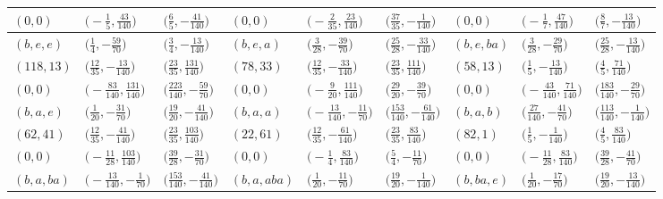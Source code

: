 \documentclass[10pt,a4paper]{amsart}
\theoremstyle{definition}
\numberwithin{equation}{section}
\begin{document}
\begin{landscape}
\begin{table}[th]
\begin{tabular}{|lll|lll|lll|}
\\
$(0, 0)$ & $\bigl(-\frac{1}{5}, \frac{43}{140}\bigr)$ & $\bigl(\frac{6}{5}, -\frac{41}{140}\bigr)$ & $(0, 0)$ & $\bigl(-\frac{2}{35}, \frac{23}{140}\bigr)$ & $\bigl(\frac{37}{35}, -\frac{1}{140}\bigr)$ & $(0, 0)$ & $\bigl(-\frac{1}{7}, \frac{47}{140}\bigr)$ & $\bigl(\frac{8}{7}, -\frac{13}{140}\bigr)$
\\\hline
$(b, e, e)$ & $\bigl(\frac{1}{4}, -\frac{59}{70}\bigr)$ & $\bigl(\frac{3}{4}, -\frac{13}{140}\bigr)$ & $(b, e, a)$ & $\bigl(\frac{3}{28}, -\frac{39}{70}\bigr)$ & $\bigl(\frac{25}{28}, -\frac{33}{140}\bigr)$ & $(b, e, ba)$ & $\bigl(\frac{3}{28}, -\frac{29}{70}\bigr)$ & $\bigl(\frac{25}{28}, -\frac{13}{140}\bigr)$
\\
$(118, 13)$ & $\bigl(\frac{12}{35}, -\frac{13}{140}\bigr)$ & $\bigl(\frac{23}{35}, \frac{131}{140}\bigr)$ & $(78, 33)$ & $\bigl(\frac{12}{35}, -\frac{33}{140}\bigr)$ & $\bigl(\frac{23}{35}, \frac{111}{140}\bigr)$ & $(58, 13)$ & $\bigl(\frac{1}{5}, -\frac{13}{140}\bigr)$ & $\bigl(\frac{4}{5}, \frac{71}{140}\bigr)$
\\
$(0, 0)$ & $\bigl(-\frac{83}{140}, \frac{131}{140}\bigr)$ & $\bigl(\frac{223}{140}, -\frac{59}{70}\bigr)$ & $(0, 0)$ & $\bigl(-\frac{9}{20}, \frac{111}{140}\bigr)$ & $\bigl(\frac{29}{20}, -\frac{39}{70}\bigr)$ & $(0, 0)$ & $\bigl(-\frac{43}{140}, \frac{71}{140}\bigr)$ & $\bigl(\frac{183}{140}, -\frac{29}{70}\bigr)$
\\\hline
$(b, a, e)$ & $\bigl(\frac{1}{20}, -\frac{31}{70}\bigr)$ & $\bigl(\frac{19}{20}, -\frac{41}{140}\bigr)$ & $(b, a, a)$ & $\bigl(-\frac{13}{140}, -\frac{11}{70}\bigr)$ & $\bigl(\frac{153}{140}, -\frac{61}{140}\bigr)$ & $(b, a, b)$ & $\bigl(\frac{27}{140}, -\frac{41}{70}\bigr)$ & $\bigl(\frac{113}{140}, -\frac{1}{140}\bigr)$
\\
$(62, 41)$ & $\bigl(\frac{12}{35}, -\frac{41}{140}\bigr)$ & $\bigl(\frac{23}{35}, \frac{103}{140}\bigr)$ & $(22, 61)$ & $\bigl(\frac{12}{35}, -\frac{61}{140}\bigr)$ & $\bigl(\frac{23}{35}, \frac{83}{140}\bigr)$ & $(82, 1)$ & $\bigl(\frac{1}{5}, -\frac{1}{140}\bigr)$ & $\bigl(\frac{4}{5}, \frac{83}{140}\bigr)$
\\
$(0, 0)$ & $\bigl(-\frac{11}{28}, \frac{103}{140}\bigr)$ & $\bigl(\frac{39}{28}, -\frac{31}{70}\bigr)$ & $(0, 0)$ & $\bigl(-\frac{1}{4}, \frac{83}{140}\bigr)$ & $\bigl(\frac{5}{4}, -\frac{11}{70}\bigr)$ & $(0, 0)$ & $\bigl(-\frac{11}{28}, \frac{83}{140}\bigr)$ & $\bigl(\frac{39}{28}, -\frac{41}{70}\bigr)$
\\\hline
$(b, a, ba)$ & $\bigl(-\frac{13}{140}, -\frac{1}{70}\bigr)$ & $\bigl(\frac{153}{140}, -\frac{41}{140}\bigr)$ & $(b, a, aba)$ & $\bigl(\frac{1}{20}, -\frac{11}{70}\bigr)$ & $\bigl(\frac{19}{20}, -\frac{1}{140}\bigr)$ & $(b, ba, e)$ & $\bigl(\frac{1}{20}, -\frac{17}{70}\bigr)$ & $\bigl(\frac{19}{20}, -\frac{13}{140}\bigr)$

\end{tabular}
\end{table}
\end{landscape}
\end{document}
